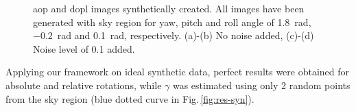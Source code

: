 \begin{figure}
  \centering
  \hfill
  \hspace*{\fill}
  \hfill
  \hspace*{\fill}
  \caption{\gls{aop} and \gls{dopl} images synthetically created. All images
    have been generated with sky region for yaw, pitch and roll angle of
    \SI{1.8}{\radian}, \SI{-0.2}{\radian} and \SI{0.1}{\radian},
    respectively. (a)-(b) No noise added, (c)-(d) Noise level of 0.1 added.}
  \label{fig:aop-dop-syn}
\end{figure}

Applying our framework on ideal synthetic data, perfect results were obtained
for absolute and relative rotations, while $\gamma$ was estimated using only 2
random points from the sky region (blue dotted curve in
Fig.\,\ref{fig:res-syn}).

